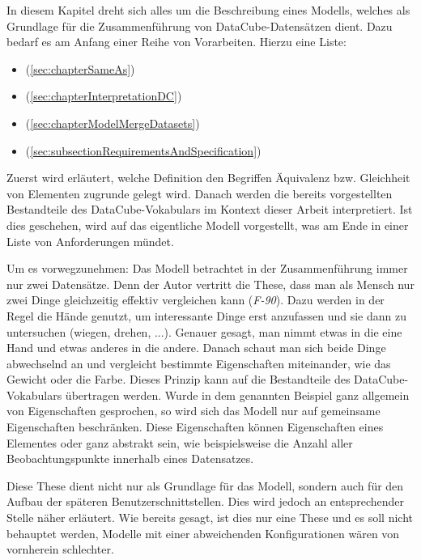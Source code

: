 \documentclass[11pt]{article}
\newcommand{\com}[1]{\marginpar{\em {\small{#1}}}} %
\begin{document}
In diesem Kapitel dreht sich alles um die Beschreibung eines Modells, welches als Grundlage für die Zusammenführung von DataCube-Datensätzen dient. Dazu bedarf es am Anfang einer Reihe von Vorarbeiten. Hierzu eine Liste:

\begin{itemize}
	\item {} (\ref{sec:chapterSameAs})
 	\item {} (\ref{sec:chapterInterpretationDC})
 	\item {} (\ref{sec:chapterModelMergeDatasets})
 	\item {} (\ref{sec:subsectionRequirementsAndSpecification})
\end{itemize}

\noindent
Zuerst wird erläutert, welche Definition den Begriffen Äquivalenz bzw. Gleichheit von Elementen zugrunde gelegt wird. Danach werden die bereits vorgestellten Bestandteile des DataCube-Vokabulars im Kontext dieser Arbeit interpretiert. Ist dies geschehen, wird auf das eigentliche Modell vorgestellt, was am Ende in einer Liste von Anforderungen mündet.

Um es vorwegzunehmen: Das Modell betrachtet in der Zusammenführung immer nur zwei Datensätze. Denn der Autor vertritt die These, dass man als Mensch nur zwei Dinge gleichzeitig effektiv vergleichen kann (\textit{F-90}).\com{Anforderung \\ F-90, S. \pageref{req:F90}}\label{req:F90source} Dazu werden in der Regel die Hände genutzt, um interessante Dinge erst anzufassen und sie dann zu untersuchen (wiegen, drehen,  ...). Genauer gesagt, man nimmt etwas in die eine Hand und etwas anderes in die andere. Danach schaut man sich beide Dinge abwechselnd an und vergleicht bestimmte Eigenschaften miteinander, wie das Gewicht oder die Farbe. Dieses Prinzip kann auf die Bestandteile des DataCube-Vokabulars übertragen werden. Wurde in dem genannten Beispiel ganz allgemein von Eigenschaften gesprochen, so wird sich das Modell nur auf gemeinsame Eigenschaften beschränken. Diese Eigenschaften können Eigenschaften eines Elementes oder ganz abstrakt sein, wie beispielsweise die Anzahl aller Beobachtungspunkte innerhalb eines Datensatzes. 

Diese These dient nicht nur als Grundlage für das Modell, sondern auch für den Aufbau der späteren Benutzerschnittstellen. Dies wird jedoch an entsprechender Stelle näher erläutert. Wie bereits gesagt, ist dies nur eine These und es soll nicht behauptet werden, Modelle mit einer abweichenden Konfigurationen wären von vornherein schlechter.
\end{document}
